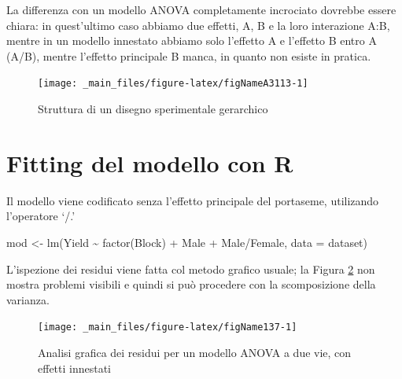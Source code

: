 \documentclass[a4paper,12pt,oneside]{book}
\newenvironment{Shaded}{\begin{snugshade}}{\end{snugshade}}
\newcommand{\SpecialCharTok}[1]{#1}
\newcommand{\OtherTok}[1]{#1}
\newcommand{\FunctionTok}[1]{#1}
\newcommand{\AttributeTok}[1]{#1}
\newcommand{\NormalTok}[1]{#1}
\begin{document}
La differenza con un modello ANOVA completamente incrociato dovrebbe essere chiara: in quest'ultimo caso abbiamo due effetti, A, B e la loro interazione A:B, mentre in un modello innestato abbiamo solo l'effetto A e l'effetto B entro A (A/B), mentre l'effetto principale B manca, in quanto non esiste in pratica.

\begin{figure}

{\centering \texttt{[image: \_main\_files/figure-latex/figNameA3113-1]} 

}

\caption{Struttura di un disegno sperimentale gerarchico}\label{fig:figNameA3113}
\end{figure}

\hypertarget{fitting-del-modello-con-r-1}{%
\section{Fitting del modello con R}\label{fitting-del-modello-con-r-1}}

Il modello viene codificato senza l'effetto principale del portaseme, utilizando l'operatore `/.'

\scriptsize

\begin{Shaded}
\begin{Highlighting}[]
\NormalTok{mod }\OtherTok{\textless{}{-}} \FunctionTok{lm}\NormalTok{(Yield }\SpecialCharTok{\textasciitilde{}} \FunctionTok{factor}\NormalTok{(Block) }\SpecialCharTok{+}\NormalTok{ Male }\SpecialCharTok{+}\NormalTok{ Male}\SpecialCharTok{/}\NormalTok{Female,}
          \AttributeTok{data =}\NormalTok{ dataset)}
\end{Highlighting}
\end{Shaded}

\normalsize

L'ispezione dei residui viene fatta col metodo grafico usuale; la Figura \ref{fig:figName137} non mostra problemi visibili e quindi si può procedere con la scomposizione della varianza.

\begin{figure}

{\centering \texttt{[image: \_main\_files/figure-latex/figName137-1]} 

}

\caption{Analisi grafica dei residui per un modello ANOVA a due vie, con effetti innestati}\label{fig:figName137}
\end{figure}
\end{document}
